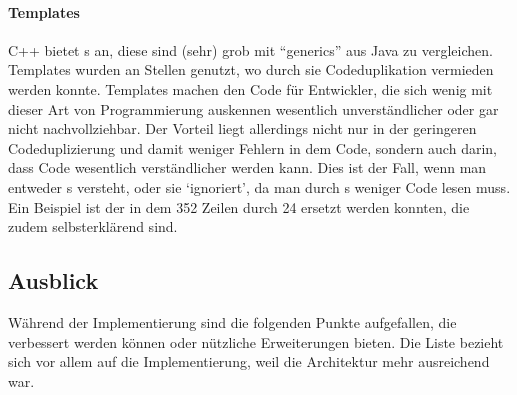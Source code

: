     \paragraph{Templates}
    C++ bietet s an, diese sind (sehr) grob mit ``generics'' aus Java zu vergleichen. Templates wurden an Stellen genutzt, wo durch sie Codeduplikation vermieden werden konnte. Templates machen den Code für Entwickler, die sich wenig mit dieser Art von Programmierung auskennen wesentlich unverständlicher oder gar nicht nachvollziehbar. Der Vorteil liegt allerdings nicht nur in der geringeren Codeduplizierung und damit weniger Fehlern in dem Code, sondern auch darin, dass Code wesentlich verständlicher werden kann. Dies ist der Fall, wenn man entweder s versteht, oder sie `ignoriert', da man durch s weniger Code lesen muss. Ein Beispiel ist der  in dem 352 Zeilen durch 24 ersetzt werden konnten, die zudem selbsterklärend sind.

  \subsection{Ausblick}
  \label{ssec:Ausblick}
    Während der Implementierung sind die folgenden Punkte aufgefallen, die verbessert werden können oder nützliche Erweiterungen bieten. Die Liste bezieht sich vor allem auf die Implementierung, weil die Architektur mehr ausreichend war.

